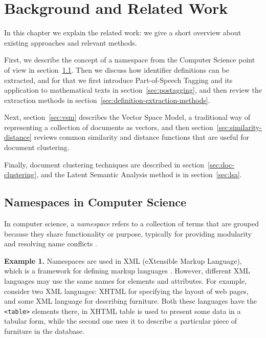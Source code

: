 \section{Background and Related Work}

In this chapter we explain the related work: we give a short overview 
about existing approaches and relevant methods. 

First, we describe the concept of a namespace from the Computer Science point
of view in section~\ref{sec:namespaces-cs}. Then we discuss how identifier 
definitions can be extracted, and for that we first introduce Part-of-Speech 
Tagging and its application to mathematical texts in section~\ref{sec:postagging},
and then review the extraction methods in section~\ref{sec:definition-extraction-methods}.

Next, section~\ref{sec:vsm}  describes the Vector Space Model, a traditional
way of representing a collection of documents as vectors, and then 
section~\ref{sec:similarity-distance} reviews common similarity and distance 
functions that are useful for document clustering. 

Finally, document clustering techniques are described in section~\ref{sec:doc-clustering},
and the Latent Semantic Analysis method is in section~\ref{sec:lsa}.


\subsection{Namespaces in Computer Science} \label{sec:namespaces-cs}

In computer science, a \emph{namespace} refers to a collection of terms
that are grouped because they share functionality or purpose,
typically for providing modularity
and resolving name conflicts \cite{duval2002metadata}.


\textbf{Example 1.} Namespaces are used in XML (eXtensible Markup Language), which
is a framework for defining markup languages \cite{moller2006introduction}.
However, different XML languages may use the same names for elements and attributes.
For example, consider two XML languages: XHTML for specifying the layout of web
pages, and some XML language for describing furniture. Both these languages have
the \verb|<table>| elements there, in XHTML table is used to present some data in
a tabular form, while the second one uses it to describe a particular piece of
furniture in the database.

